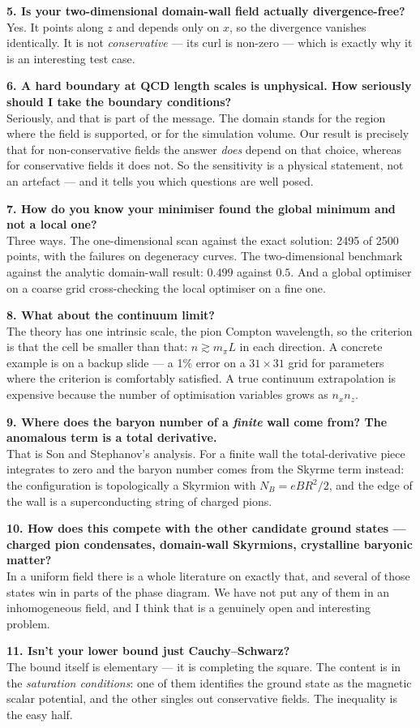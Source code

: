 \documentclass[11pt,a4paper]{article}
\newcommand{\mpi}{m_\pi}
\begin{document}
\textbf{5. Is your two-dimensional domain-wall field actually divergence-free?}\\
Yes. It points along $z$ and depends only on $x$, so the divergence vanishes
identically. It is not \emph{conservative} --- its curl is non-zero --- which is
exactly why it is an interesting test case.

\textbf{6. A hard boundary at QCD length scales is unphysical. How seriously should
I take the boundary conditions?}\\
Seriously, and that is part of the message. The domain stands for the region where
the field is supported, or for the simulation volume. Our result is precisely that
for non-conservative fields the answer \emph{does} depend on that choice, whereas for
conservative fields it does not. So the sensitivity is a physical statement, not an
artefact --- and it tells you which questions are well posed.

\textbf{7. How do you know your minimiser found the global minimum and not a local
one?}\\
Three ways. The one-dimensional scan against the exact solution: 2495 of 2500 points,
with the failures on degeneracy curves. The two-dimensional benchmark against the
analytic domain-wall result: $0.499$ against $0.5$. And a global optimiser on a
coarse grid cross-checking the local optimiser on a fine one.

\textbf{8. What about the continuum limit?}\\
The theory has one intrinsic scale, the pion Compton wavelength, so the criterion is
that the cell be smaller than that: $n \gtrsim \mpi L$ in each direction. A concrete
example is on a backup slide --- a 1\% error on a $31 \times 31$ grid for parameters
where the criterion is comfortably satisfied. A true continuum extrapolation is
expensive because the number of optimisation variables grows as $n_x n_z$.

\textbf{9. Where does the baryon number of a \emph{finite} wall come from? The
anomalous term is a total derivative.}\\
That is Son and Stephanov's analysis. For a finite wall the total-derivative piece
integrates to zero and the baryon number comes from the Skyrme term instead: the
configuration is topologically a Skyrmion with $N_B = eBR^2/2$, and the edge of the
wall is a superconducting string of charged pions.

\textbf{10. How does this compete with the other candidate ground states --- charged
pion condensates, domain-wall Skyrmions, crystalline baryonic matter?}\\
In a uniform field there is a whole literature on exactly that, and several of those
states win in parts of the phase diagram. We have not put any of them in an
inhomogeneous field, and I think that is a genuinely open and interesting problem.

\textbf{11. Isn't your lower bound just Cauchy--Schwarz?}\\
The bound itself is elementary --- it is completing the square. The content is in the
\emph{saturation conditions}: one of them identifies the ground state as the magnetic
scalar potential, and the other singles out conservative fields. The inequality is
the easy half.
\end{document}

